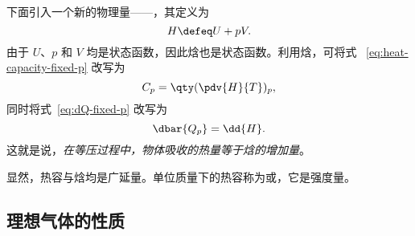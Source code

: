 下面引入一个新的物理量——，其定义为
\begin{equation}
  H \defeq U + p V.
\end{equation}
由于 $U$、$p$ 和 $V$ 均是状态函数，因此焓也是状态函数。利用焓，可将式~%
\eqref{eq:heat-capacity-fixed-p} 改写为
\begin{equation} \label{eq:heat-capacity-fixed-p-with-H}
  C_p = \qty(\pdv{H}{T})_p,
\end{equation}
同时将式~\eqref{eq:dQ-fixed-p} 改写为
\begin{equation}
  \dbar{Q_p} = \dd{H}.
\end{equation}
这就是说，\emph{在等压过程中，物体吸收的热量等于焓的增加量}。

显然，热容与焓均是广延量。单位质量下的热容称为或，它是强度量。

\subsection{理想气体的性质} \label{subsec:ideal-gas-property} %

